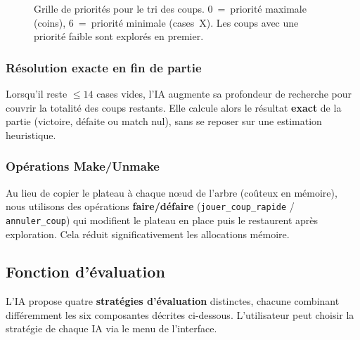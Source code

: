 \documentclass[12pt, a4paper]{article}
\begin{document}
\begin{figure}[H]
\centering
{}
\caption{Grille de priorités pour le tri des coups. 0~=~priorité maximale (coins), 6~=~priorité minimale (cases~X). Les coups avec une priorité faible sont explorés en premier.}
\label{fig:priorites}
\end{figure}


\subsubsection{Résolution exacte en fin de partie}

Lorsqu'il reste $\leq 14$ cases vides, l'IA augmente sa profondeur de recherche pour couvrir la totalité des coups restants. Elle calcule alors le résultat \textbf{exact} de la partie (victoire, défaite ou match nul), sans se reposer sur une estimation heuristique.

\subsubsection{Opérations Make/Unmake}

Au lieu de copier le plateau à chaque nœud de l'arbre (coûteux en mémoire), nous utilisons des opérations \textbf{faire/défaire} (\texttt{jouer\_coup\_rapide} / \texttt{annuler\_coup}) qui modifient le plateau en place puis le restaurent après exploration. Cela réduit significativement les allocations mémoire.


\subsection{Fonction d'évaluation}

L'IA propose quatre \textbf{stratégies d'évaluation} distinctes, chacune combinant différemment les six composantes décrites ci-dessous. L'utilisateur peut choisir la stratégie de chaque IA via le menu de l'interface.
\end{document}
